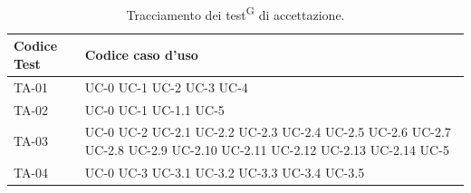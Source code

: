 \documentclass[8pt]{article}
\newcommand{\glossterm}[1]{#1\textsuperscript{G}} %
\begin{document}
\begin{longtable}{|>{\centering}p{4cm}|>{\centering\arraybackslash}p{4cm}|}
\hline
\rowcolor{white}
\textbf{Codice Test} & \textbf{Codice caso d'uso} \\
\hline
\endfirsthead
\rowcolor{white}
\caption{Tracciamento dei \glossterm{test} di accettazione.}
\label{table:Tracciamento dei test di accettazione}
\endlastfoot
    TA-01 & UC-0 \newline
            UC-1 \newline
            UC-2 \newline
            UC-3 \newline
            UC-4 
    \\
    \hline
    TA-02 & UC-0 \newline
            UC-1 \newline
            UC-1.1 \newline
            UC-5
    \\
    \hline 
    TA-03 & UC-0 \newline
            UC-2 \newline
            UC-2.1 \newline
            UC-2.2 \newline
            UC-2.3 \newline
            UC-2.4 \newline
            UC-2.5 \newline
            UC-2.6 \newline
            UC-2.7 \newline
            UC-2.8 \newline
            UC-2.9 \newline
            UC-2.10 \newline
            UC-2.11 \newline
            UC-2.12 \newline
            UC-2.13 \newline
            UC-2.14 \newline
            UC-5
    \\
    \hline
    TA-04 & UC-0 \newline
            UC-3 \newline 
            UC-3.1 \newline
            UC-3.2 \newline
            UC-3.3 \newline
            UC-3.4 \newline
            UC-3.5 \newline

\end{longtable}
\end{document}
